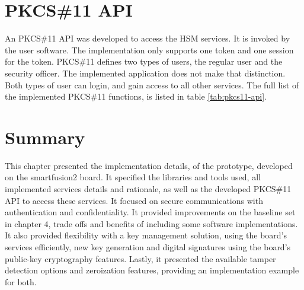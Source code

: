 \section{PKCS\#11 API}\label{chap:implementation:app:pkcs}

An PKCS\#11 API was developed to access the HSM services. It is invoked by the user software.
The implementation only supports one token and one session for the token.
PKCS\#11 defines two types of users, the regular user and the security officer. The implemented application does not make that distinction. Both types of user can login, and gain access to all other services.
The full list of the implemented PKCS\#11 functions, is listed in table \ref{tab:pkcs11-api}.

\section*{Summary}\label{chap:implementation:summary}

This chapter presented the implementation details, of the prototype, developed on the smartfusion2 board. It specified the libraries and tools used, all implemented services details and rationale, as well as the developed PKCS\#11 API to access these services. It focused on secure communications with authentication and confidentiality. It provided improvements on the baseline set in chapter 4, trade offs and benefits of including some software implementations. It also provided flexibility with a key management solution, using the board's services efficiently, new key generation and digital signatures using the board's public-key cryptography features. Lastly, it presented the available tamper detection options and zeroization features, providing an implementation example for both.

